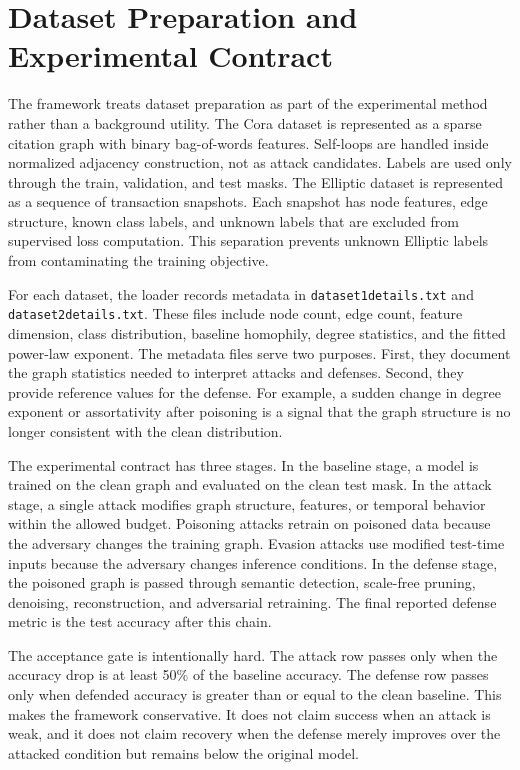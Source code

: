 \documentclass[12pt,oneside]{report}
\begin{document}
\section{Dataset Preparation and Experimental Contract}
The framework treats dataset preparation as part of the experimental method rather than a background utility. The Cora dataset is represented as a sparse citation graph with binary bag-of-words features. Self-loops are handled inside normalized adjacency construction, not as attack candidates. Labels are used only through the train, validation, and test masks. The Elliptic dataset is represented as a sequence of transaction snapshots. Each snapshot has node features, edge structure, known class labels, and unknown labels that are excluded from supervised loss computation. This separation prevents unknown Elliptic labels from contaminating the training objective.

For each dataset, the loader records metadata in \texttt{dataset1details.txt} and \texttt{dataset2details.txt}. These files include node count, edge count, feature dimension, class distribution, baseline homophily, degree statistics, and the fitted power-law exponent. The metadata files serve two purposes. First, they document the graph statistics needed to interpret attacks and defenses. Second, they provide reference values for the defense. For example, a sudden change in degree exponent or assortativity after poisoning is a signal that the graph structure is no longer consistent with the clean distribution.

The experimental contract has three stages. In the baseline stage, a model is trained on the clean graph and evaluated on the clean test mask. In the attack stage, a single attack modifies graph structure, features, or temporal behavior within the allowed budget. Poisoning attacks retrain on poisoned data because the adversary changes the training graph. Evasion attacks use modified test-time inputs because the adversary changes inference conditions. In the defense stage, the poisoned graph is passed through semantic detection, scale-free pruning, denoising, reconstruction, and adversarial retraining. The final reported defense metric is the test accuracy after this chain.

The acceptance gate is intentionally hard. The attack row passes only when the accuracy drop is at least 50\% of the baseline accuracy. The defense row passes only when defended accuracy is greater than or equal to the clean baseline. This makes the framework conservative. It does not claim success when an attack is weak, and it does not claim recovery when the defense merely improves over the attacked condition but remains below the original model.
\end{document}
